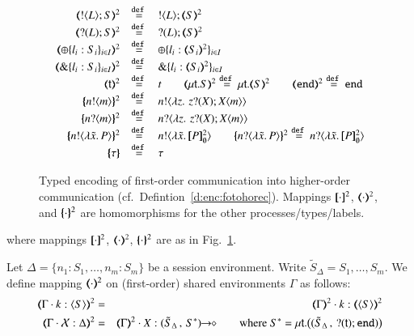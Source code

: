 \begin{definition}
\begin{figure}[t]
\[\begin{array}{rcll}
		\tmap{\btout{L} S}{2} &\defeq& \btout{L} \tmap{S}{2}\\
		\tmap{\btinp{L} S}{2} &\defeq& \btinp{L} \tmap{S}{2}\\
		\tmap{\btsel{l_i: S_i}_{i \in I}}{2} &\defeq& \btsel{l_i: \tmap{S_i}{2}}_{i \in I}\\
		\tmap{\btbra{l_i: S_i}_{i \in I}}{2} &\defeq& \btbra{l_i: \tmap{S_i}{2}}_{i \in I}\\

		\tmap{\vart{t}}{2} &\defeq& {t} \qquad
		\tmap{\trec{t}{S}}{2} \defeq \trec{t}{\tmap{S}{2}} \qquad
		\tmap{\tinact}{2} \defeq \tinact\\

		\mapa{\bactout{n}{m}}^{2} &\defeq&   \bactout{n}{\abs{z}{\,\binp{z}{X} \appl{X}{m}} } \\
		\mapa{\bactinp{n}{m}}^{2} &\defeq&   \bactinp{n}{\abs{z}{\,\binp{z}{X} \appl{X}{m}} } \\

		\mapa{\bactout{n}{\abs{\tilde{x}}{P}}}^{2} &\defeq& \bactout{n}{\abs{\tilde{x}}{\pmapp{P}{2}{\es}}} \qquad
		\mapa{\bactinp{n}{\abs{\tilde{x}}{P}}}^{2} \defeq \bactinp{n}{\abs{\tilde{x}}{\pmapp{P}{2}{\es}}}\\
		\mapa{\tau} &\defeq& \tau
	\end{array}
\]
\caption{\label{f:enc:fotohorec}
Typed encoding of first-order communication into higher-order communication (cf.~Defintion~\ref{d:enc:fotohorec}).
Mappings 
$[\!\![\cdot]\!\!]^2$,
$(\!\!\langle\cdot\rangle\!\!)^2$, 
and 
$\{\!\!\{\cdot\}\!\!\}^2$
are homomorphisms for the other processes/types/labels. 
}

\end{figure}
where mappings $[\!\![\cdot]\!\!]^{2}$, $(\!\!\langle\cdot\rangle\!\!)^{2}$, $\{\!\!\{\cdot\}\!\!\}^{2}$
are as in Fig.~\ref{f:enc:fotohorec}.
\end{definition}

\begin{remark}
Let $\Delta = \{n_1:S_1, \ldots, n_m:S_m\}$ be a session environment.
Write $\tilde{S}_{\Delta} = S_1, \ldots, S_m$.
	We define  mapping $(\!\!\langle\cdot\rangle\!\!)^{2}$ on (first-order) shared environments $\Gamma$ as follows:
	\begin{eqnarray*}
	\mapt{\Gamma \cat k:\chtype{S}}^{2} & =  & \mapt{\Gamma}^{2} \cat k:\mapt{\chtype{S}}^{2} \\
	\tmap{\Gamma \cat \rvar{X}:\Delta}{2} & = & \tmap{\Gamma}{2} \cat X:\shot{(\tilde{S}_{\Delta}\,,\,S^*)}\qquad 
		\text{where
	$S^* = \trec{t}{\big((\tilde{S}_{\Delta}\,,\, \btinp{\vart{t}}\tinact)\big)}$}
	\end{eqnarray*}
\end{remark}

